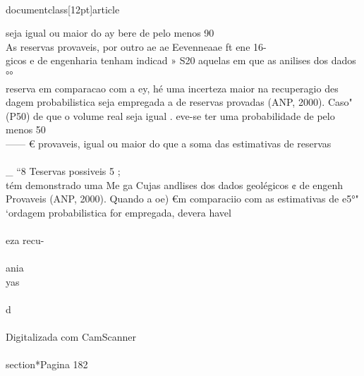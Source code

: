 \\documentclass[12pt]{article}
\begin{document}
seja igual ou maior do ay bere de pelo menos 90\\%
As reservas provaveis, por outro ae ae Eevenneaae ft ene 16-\\
gicos e de engenharia tenham indicad » S20 aquelas em que as anilises dos dados °°\\
reserva em comparacao com a ey, hé uma incerteza maior na recuperagio des\\
dagem probabilistica seja empregada a de reservas provadas (ANP, 2000). Caso"\\
(P50) de que o volume real seja igual . eve-se ter uma probabilidade de pelo menos 50\\%
—— € provaveis, igual ou maior do que a soma das estimativas de reservas\\
\\_ “8 Teservas possiveis 5 ;\\
tém demonstrado uma Me ga Cujas andlises dos dados geolégicos ¢ de engenh\\
Provaveis (ANP, 2000). Quando a oe) €m comparaciio com as estimativas de e5°"\\
‘ordagem probabilistica for empregada, devera havel\\
\\
eza recu-\\
\\
ania\\
yas\\
\\
d\\
\\
Digitalizada com CamScanner\\

\\section*{Pagina 182}
\end{document}
